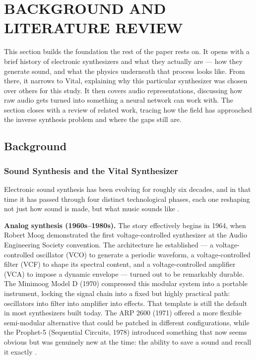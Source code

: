 
\section{BACKGROUND AND LITERATURE REVIEW}
\label{sec:background}

This section builds the foundation the rest of the paper rests on. It opens with a brief history of electronic synthesizers and what they actually are --- how they generate sound, and what the physics underneath that process looks like. From there, it narrows to Vital, explaining why this particular synthesizer was chosen over others for this study. It then covers audio representations, discussing how raw audio gets turned into something a neural network can work with. The section closes with a review of related work, tracing how the field has approached the inverse synthesis problem and where the gaps still are.

\subsection{Background}

\subsubsection{Sound Synthesis and the Vital Synthesizer}
\label{ssub:sound_synthesis}


Electronic sound synthesis has been evolving for roughly six decades, and in that time it has passed through four distinct technological phases, each one reshaping not just how sound is made, but what music sounds like \cite{roads1996computer}.

\par \vspace{0.3cm}

\noindent \textbf{Analog synthesis (1960s--1980s).} The story effectively begins in 1964, when Robert Moog demonstrated the first voltage-controlled synthesizer at the Audio Engineering Society convention. The architecture he established --- a voltage-controlled oscillator (VCO) to generate a periodic waveform, a voltage-controlled filter (VCF) to shape its spectral content, and a voltage-controlled amplifier (VCA) to impose a dynamic envelope --- turned out to be remarkably durable. The Minimoog Model D (1970) compressed this modular system into a portable instrument, locking the signal chain into a fixed but highly practical path: oscillators into filter into amplifier into effects. That template is still the default in most synthesizers built today. The ARP 2600 (1971) offered a more flexible semi-modular alternative that could be patched in different configurations, while the Prophet-5 (Sequential Circuits, 1978) introduced something that now seems obvious but was genuinely new at the time: the ability to save a sound and recall it exactly \cite{cook2002realsound}.

